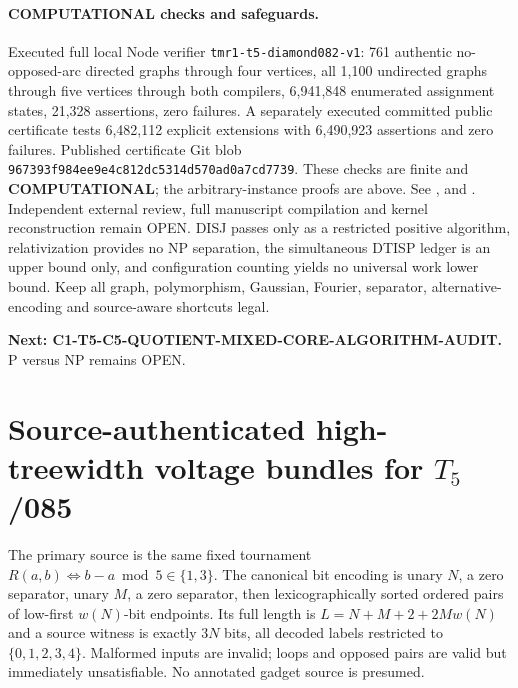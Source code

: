 \documentclass[11pt]{article}
\begin{document}
\paragraph{COMPUTATIONAL checks and safeguards.}
Executed full local Node verifier \texttt{tmr1-t5-diamond082-v1}:
761 authentic no-opposed-arc directed graphs through four vertices,
all 1,100 undirected graphs through five vertices through both
compilers, 6,941,848 enumerated assignment states,
21,328 assertions, zero failures. A separately executed
committed public certificate tests 6,482,112 explicit extensions
with 6,490,923 assertions and zero failures.
Published certificate Git blob
\texttt{967393f984ee9e4c812dc5314d570ad0a7cd7739}.
These checks are finite and \textbf{COMPUTATIONAL};
the arbitrary-instance proofs are above. See
,
 and
.
Independent external review, full manuscript compilation
and kernel reconstruction remain OPEN. DISJ passes only as a
restricted positive algorithm, relativization provides no NP
separation, the simultaneous DTISP ledger is an upper bound
only, and configuration counting yields no universal work
lower bound. Keep all graph, polymorphism, Gaussian, Fourier,
separator, alternative-encoding and source-aware shortcuts legal.

\textbf{Next: C1-T5-C5-QUOTIENT-MIXED-CORE-ALGORITHM-AUDIT.}
P versus NP remains OPEN.


\section{Source-authenticated high-treewidth voltage bundles for $T_5$ /085}
The primary source is the same fixed tournament
$R(a,b)\Longleftrightarrow b-a\bmod5\in\{1,3\}$.
The canonical bit encoding is unary $N$, a zero separator,
unary $M$, a zero separator, then lexicographically sorted ordered
pairs of low-first $w(N)$-bit endpoints. Its full length is
$L=N+M+2+2Mw(N)$ and a source witness is exactly $3N$ bits,
all decoded labels restricted to $\{0,1,2,3,4\}$.
Malformed inputs are invalid; loops and opposed pairs are valid
but immediately unsatisfiable. No annotated gadget source is presumed.
\end{document}
